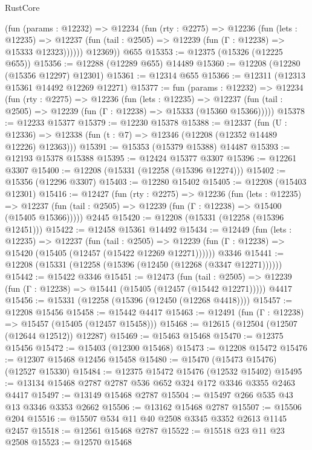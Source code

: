 \begin{lexlean}{RustCore}
\begin{coremodule}
          (fun (params : @12232) =>
          @12234
            (fun (rty : @2275) =>
            @12236
              (fun (lets : @12235) =>
              @12237 (fun (tail : @2505) => @12239 (fun (Γ : @12238) => @15333 @12323))))))
        @12369))
    @655
@15353 := @12375 (@15326 (@12225 @655))
@15356 := @12288 (@12289 @655) @14489
@15360 := @12208 (@12280 (@15356 @12297) @12301)
@15361 := @12314 @655
@15366 := @12311 (@12313 @15361 @14492 @12269 @12271)
@15377 := fun (params : @12232) =>
  @12234
    (fun (rty : @2275) =>
    @12236
      (fun (lets : @12235) =>
      @12237 (fun (tail : @2505) => @12239 (fun (Γ : @12238) => @15333 (@15360 @15366)))))
@15378 := @12233 @15377
@15379 := @12230 @15378
@15388 := @12337
    (fun (U : @12336) => @12338 (fun (t : @7) => @12346 (@12208 (@12352 @14489 @12226) @12363)))
@15391 := @15353 (@15379 @15388) @14487
@15393 := @12193 @15378 @15388
@15395 := @12424 @15377 @3307
@15396 := @12261 @3307
@15400 := @12208 (@15331 (@12258 (@15396 @12274)))
@15402 := @15356 (@12296 @3307)
@15403 := @12280 @15402
@15405 := @12208 (@15403 @12301)
@15416 := @12427
    (fun (rty : @2275) =>
    @12236
      (fun (lets : @12235) =>
      @12237 (fun (tail : @2505) => @12239 (fun (Γ : @12238) => @15400 (@15405 @15366)))))
    @2445
@15420 := @12208 (@15331 (@12258 (@15396 @12451)))
@15422 := @12458 @15361 @14492
@15434 := @12449
    (fun (lets : @12235) =>
    @12237
      (fun (tail : @2505) =>
      @12239 (fun (Γ : @12238) => @15420 (@15405 (@12457 (@15422 @12269 @12271))))))
    @3346
@15441 := @12208 (@15331 (@12258 (@15396 (@12450 (@12268 (@3347 @12271))))))
@15442 := @15422 @3346
@15451 := @12473
    (fun (tail : @2505) => @12239 (fun (Γ : @12238) => @15441 (@15405 (@12457 (@15442 @12271)))))
    @4417
@15456 := @15331 (@12258 (@15396 (@12450 (@12268 @4418))))
@15457 := @12208 @15456
@15458 := @15442 @4417
@15463 := @12491 (fun (Γ : @12238) => @15457 (@15405 (@12457 @15458)))
@15468 := @12615 (@12504 (@12507 (@12644 @12512)) @12287)
@15469 := @15463 @15468
@15470 := @12375 @15456
@15472 := @15403 (@12300 @15468)
@15473 := @12208 @15472
@15476 := @12307 @15468 @12456 @15458
@15480 := @15470 (@15473 @15476) (@12527 @15330)
@15484 := @12375 @15472 @15476 (@12532 @15402)
@15495 := @13134 @15468 @2787 @2787 @536 @652 @324 @172 @3346 @3355 @2463 @4417
@15497 := @13149 @15468 @2787
@15504 := @15497 @266 @535 @43 @13 @3346 @3353 @2662
@15506 := @13162 @15468 @2787
@15507 := @15506 @204
@15516 := @15507 @534 @11 @40 @2508 @3345 @3352 @2613 @1145 @2457
@15518 := @12561 @15468 @2787
@15522 := @15518 @23 @11 @23 @2508
@15523 := @12570 @15468

\end{coremodule}
\end{lexlean}
